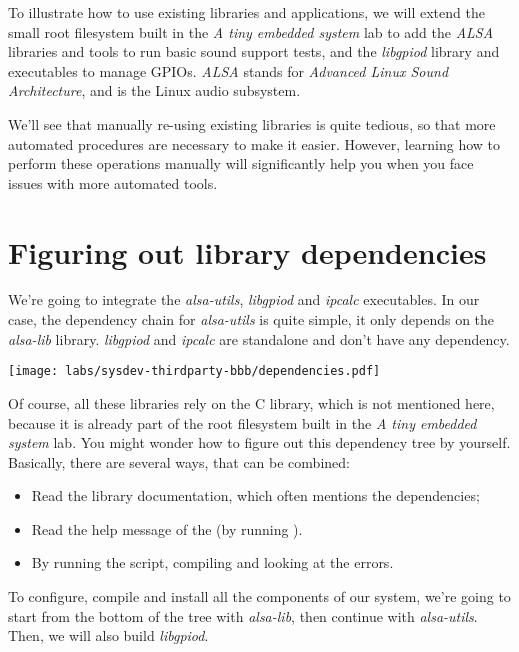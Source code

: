 
To illustrate how to use existing libraries and applications, we will
extend the small root filesystem built in the {\em A tiny embedded
system} lab to add the {\em ALSA} libraries and tools to run
basic sound support tests, and the {\em libgpiod} library and
executables to manage GPIOs. {\em ALSA} stands for {\em Advanced Linux
Sound Architecture}, and is the Linux audio subsystem.

We'll see that manually re-using existing libraries is quite tedious,
so that more automated procedures are necessary to make it
easier. However, learning how to perform these operations manually
will significantly help you when you face issues with more
automated tools.

\section{Figuring out library dependencies}

We're going to integrate the {\em alsa-utils}, {\em libgpiod}
and {\em ipcalc} executables. In our case, the dependency chain
for {\em alsa-utils} is quite simple, it only depends on the
{\em alsa-lib} library. {\em libgpiod} and {\em ipcalc} are standalone
and don't have any dependency.

\texttt{[image: labs/sysdev-thirdparty-bbb/dependencies.pdf]}

Of course, all these libraries rely on the C library, which is not
mentioned here, because it is already part of the root filesystem
built in the {\em A tiny embedded system} lab. You might wonder how to
figure out this dependency tree by yourself. Basically, there are
several ways, that can be combined:

\begin{itemize}
\item Read the library documentation, which often mentions the
  dependencies;
\item Read the help message of the  (by running
  ).
\item By running the  script, compiling and looking
  at the errors.
\end{itemize}

To configure, compile and install all the components of our system,
we're going to start from the bottom of the tree with {\em alsa-lib},
then continue with {\em alsa-utils}. Then, we will also build
{\em libgpiod}.

